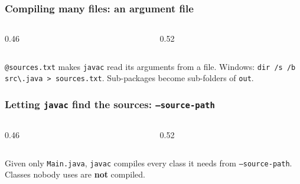 \documentclass[aspectratio=169,10pt,compress]{beamer}
\newcommand{\cmd}[1]{\texttt{\color{gitred}#1}}
\begin{document}
\begin{frame}[t,fragile] \frametitle{Compiling many files: an argument file}
  \begin{columns}[T]
    \begin{column}{0.46\textwidth}
    \end{column}
    \begin{column}{0.52\textwidth}
    \end{column}
  \end{columns}

  \vspace{0.2em}
  \small \texttt{@sources.txt} makes \texttt{javac} read its arguments from a file. Windows:
  \cmd{dir /s /b src\textbackslash *.java > sources.txt}. Sub-packages become sub-folders of \texttt{out}.
\end{frame}




\begin{frame}[t,fragile] \frametitle{Letting \texttt{javac} find the sources: \texttt{--source-path}}
  \begin{columns}[T]
    \begin{column}{0.46\textwidth}
    \end{column}
    \begin{column}{0.52\textwidth}
    \end{column}
  \end{columns}

  \vspace{0.2em}
  \small Given only \texttt{Main.java}, \texttt{javac} compiles every class it needs from \texttt{--source-path}.
  Classes nobody uses are \textbf{not} compiled.
\end{frame}


\end{document}
